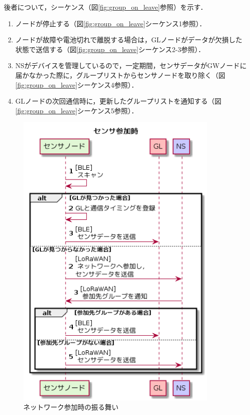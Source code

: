 後者について，シーケンス（図\ref{fig:group_on_leave}参照）を示す．

\begin{enumerate}
    \item ノードが停止する（図\ref{fig:group_on_leave}シーケンス1参照）．
    \item ノードが故障や電池切れで離脱する場合は，GLノードがデータが欠損した状態で送信する（図\ref{fig:group_on_leave}シーケンス2-3参照）．
    \item NSがデバイスを管理しているので，一定期間，センサデータがGWノードに届かなかった際に，グループリストからセンサノードを取り除く（図\ref{fig:group_on_leave}シーケンス4参照）．
    \item GLノードの次回通信時に，更新したグループリストを通知する（図\ref{fig:group_on_leave}シーケンス5参照）．
\end{enumerate}

\begin{figure}[]
    \begin{center}
    \includegraphics[width=10cm]{figures/v2.0/センサ参加時.png}
    \caption{ネットワーク参加時の振る舞い}
    \label{fig:group_on_join}
    \end{center}
\end{figure}


